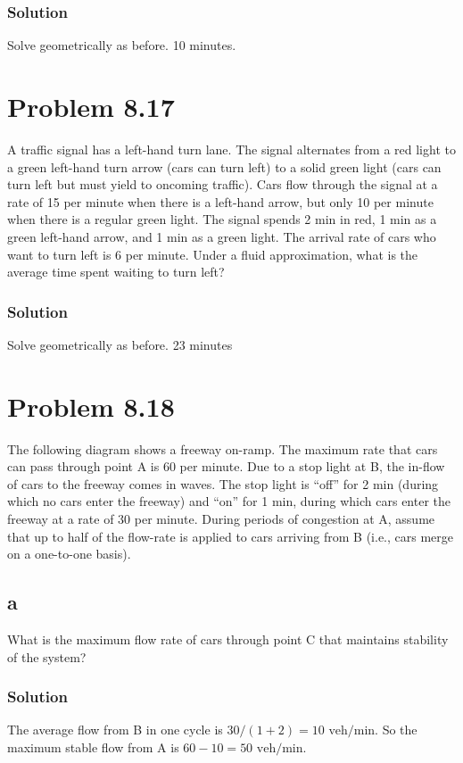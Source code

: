 \documentclass[letterpaper]{amsart}
\begin{document}
\subsubsection*{Solution}
Solve geometrically as before.
10 minutes.

\section{Problem 8.17} %
A traffic signal has a left-hand turn lane. The signal alternates from a red
light to a green left-hand turn arrow (cars can turn left) to a solid green light
(cars can turn left but must yield to oncoming traffic). Cars flow through
the signal at a rate of 15 per minute when there is a left-hand arrow, but
only 10 per minute when there is a regular green light. The signal spends
2 min in red, 1 min as a green left-hand arrow, and 1 min as a green light.
The arrival rate of cars who want to turn left is 6 per minute. Under a fluid
approximation, what is the average time spent waiting to turn left?
\subsubsection*{Solution}
Solve geometrically as before.
23 minutes

\section{Problem 8.18} %
The following diagram shows a freeway on-ramp. The maximum rate that
cars can pass through point A is 60 per minute. Due to a stop light at B, the
in-flow of cars to the freeway comes in waves. The stop light is ``off'' for
2 min (during which no cars enter the freeway) and ``on'' for 1 min, during
which cars enter the freeway at a rate of 30 per minute. During periods of
congestion at A, assume that up to half of the flow-rate is applied to cars
arriving from B (i.e., cars merge on a one-to-one basis).
\subsection*{a}
What is the maximum flow rate of cars through point C that maintains
stability of the system?
\subsubsection*{Solution}
The average flow from B in one cycle is $30 /(1+2)=10\text{ veh/min}$. So the
maximum stable flow from A is $60-10=50\text{ veh/min}$.
\end{document}
